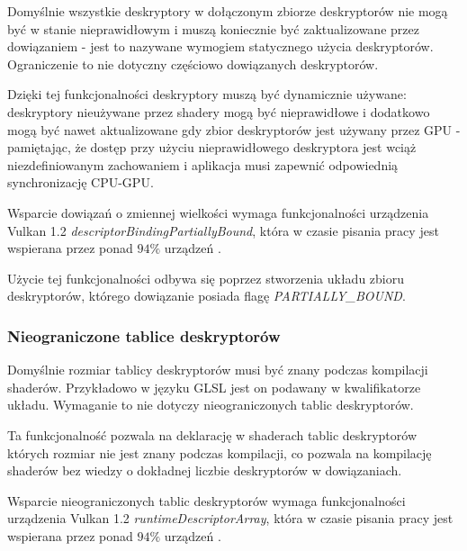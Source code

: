 Domyślnie wszystkie deskryptory w dołączonym zbiorze deskryptorów nie mogą być w stanie nieprawidłowym i muszą koniecznie być zaktualizowane przez dowiązaniem - jest to nazywane wymogiem statycznego użycia deskryptorów.
Ograniczenie to nie dotyczny częściowo dowiązanych deskryptorów.

Dzięki tej funkcjonalności deskryptory muszą być dynamicznie używane: deskryptory nieużywane przez shadery mogą być nieprawidłowe i dodatkowo mogą być nawet aktualizowane gdy zbior deskryptorów jest używany przez GPU - pamiętając, że dostęp przy użyciu nieprawidłowego deskryptora jest wciąż niezdefiniowanym zachowaniem i aplikacja musi zapewnić odpowiednią synchronizację CPU-GPU.

Wsparcie dowiązań o zmiennej wielkości wymaga funkcjonalności urządzenia Vulkan 1.2 \textit{descriptorBindingPartiallyBound}, która w czasie pisania pracy jest wspierana przez ponad $94\%$ urządzeń \cite{GPUINFO}.

Użycie tej funkcjonalności odbywa się poprzez stworzenia układu zbioru deskryptorów, którego dowiązanie posiada flagę \textit{PARTIALLY\_BOUND}.

\subsubsection {Nieograniczone tablice deskryptorów}

Domyślnie rozmiar tablicy deskryptorów musi być znany podczas kompilacji shaderów. Przykładowo w języku GLSL jest on podawany w kwalifikatorze układu.
Wymaganie to nie dotyczy nieograniczonych tablic deskryptorów.

Ta funkcjonalność pozwala na deklarację w shaderach tablic deskryptorów których rozmiar nie jest znany podczas kompilacji, co pozwala na kompilację shaderów bez wiedzy o dokładnej liczbie deskryptorów w dowiązaniach.

Wsparcie nieograniczonych tablic deskryptorów wymaga funkcjonalności urządzenia Vulkan 1.2 \textit{runtimeDescriptorArray}, która w czasie pisania pracy jest wspierana przez ponad $94\%$ urządzeń \cite{GPUINFO}.

